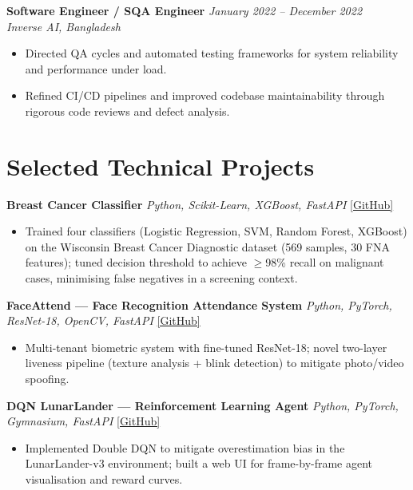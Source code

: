 \documentclass[11pt, letterpaper]{article}
\begin{document}
\vspace{6pt}

\noindent\textbf{Software Engineer / SQA Engineer} \hfill \textit{January 2022 – December 2022}\\
\textit{Inverse AI, Bangladesh}
\begin{itemize}
  \item Directed QA cycles and automated testing frameworks for system reliability
        and performance under load.
  \item Refined CI/CD pipelines and improved codebase maintainability through
        rigorous code reviews and defect analysis.
\end{itemize}

\section{Selected Technical Projects}

\noindent\textbf{Breast Cancer Classifier} \hfill
\textit{Python, Scikit-Learn, XGBoost, FastAPI} \hfill \href{https://github.com/ayanchyaziz123/breast-cancer-classifier}{\small[GitHub]}
\begin{itemize}
  \item Trained four classifiers (Logistic Regression, SVM, Random Forest, XGBoost) on the
        Wisconsin Breast Cancer Diagnostic dataset (569 samples, 30 FNA features); tuned
        decision threshold to achieve $\geq$98\% recall on malignant cases, minimising
        false negatives in a screening context.
\end{itemize}

\noindent\textbf{FaceAttend — Face Recognition Attendance System} \hfill
\textit{Python, PyTorch, ResNet-18, OpenCV, FastAPI} \hfill \href{https://github.com/ayanchyaziz123/face-recognition-api}{\small[GitHub]}
\begin{itemize}
  \item Multi-tenant biometric system with fine-tuned ResNet-18; novel two-layer liveness
        pipeline (texture analysis + blink detection) to mitigate photo/video spoofing.
\end{itemize}

\noindent\textbf{DQN LunarLander — Reinforcement Learning Agent} \hfill
\textit{Python, PyTorch, Gymnasium, FastAPI} \hfill \href{https://github.com/ayanchyaziz123/dqn-lunarlander}{\small[GitHub]}
\begin{itemize}
  \item Implemented Double DQN to mitigate overestimation bias in the LunarLander-v3
        environment; built a web UI for frame-by-frame agent visualisation and reward curves.
\end{itemize}
\end{document}
